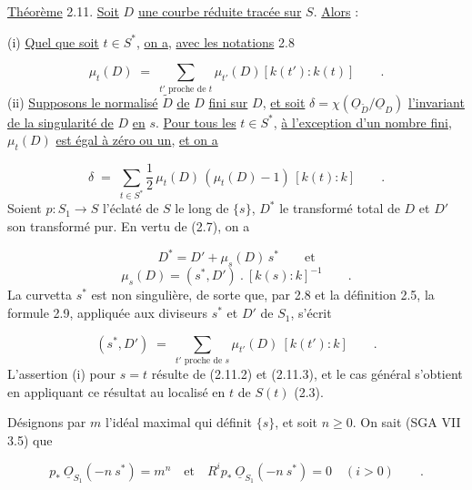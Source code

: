 \underline{Théorème} 2.11. \underline{Soit} $D$ \underline{une courbe réduite tracée sur} $S$. \underline{Alors} :

(i) \underline{Quel que soit} $t \in S^*$, \underline{on a}, \underline{avec les notations} 2.8

\begin{equation*}
\mu_t(D) \;=\; \sum_{t' \text{ proche de } t} \mu_{t'}(D)[k(t'):k(t)] \qquad .
\end{equation*}
(ii) \underline{Supposons le normalisé} $\widetilde{D}$ \underline{de} $D$ \underline{fini sur} $D$, \underline{et soit} $\delta = \chi(\underline{O}_{\widetilde{D}}/\underline{O}_D)$ \underline{l'invariant de la singularité de} $D$ \underline{en} $s$. \underline{Pour tous les} $t \in S^*$, \underline{à l'exception d'un nombre fini}, $\mu_t(D)$ \underline{est égal à zéro ou un}, \underline{et on a}

\begin{equation*}
\delta \;=\; \sum_{t \in S^*} \frac{1}{2}\,\mu_t(D)\,(\mu_t(D)-1)\,[k(t):k] \qquad .
\end{equation*}
Soient $p : S_1 \longrightarrow S$ l'éclaté de $S$ le long de $\{s\}$, $D^*$ le transformé total de $D$ et $D'$ son transformé pur. En vertu de (2.7), on a

\begin{equation}\tag{2.11.1}
D^* = D' + \mu_s(D)\, s^* \qquad \text{et}
\end{equation}
\begin{equation}\tag{2.11.2}
\mu_s(D) = (s^*,D')\ .\ [k(s):k]^{-1} \qquad .
\end{equation}
La curvetta $s^*$ est non singulière, de sorte que, par 2.8 et la définition 2.5, la formule 2.9, appliquée aux diviseurs $s^*$ et $D'$ de $S_1$, s'écrit

\begin{equation}\tag{2.11.3}
(s^*,D') \;=\; \sum_{t' \text{ proche de } s} \mu_{t'}(D)\ [k(t'):k] \qquad .
\end{equation}
L'assertion (i) pour $s = t$ résulte de (2.11.2) et (2.11.3), et le cas général s'obtient en appliquant ce résultat au localisé en $t$ de $S(t)$ (2.3).

Désignons par $m$ l'idéal maximal qui définit $\{s\}$, et soit $n \geq 0$. On sait (SGA VII 3.5) que

\begin{equation}\tag{2.11.4}
p_*\ \underline{O}_{S_1}(-n\ s^*) = m^n \quad \text{et} \quad R^i p_*\ \underline{O}_{S_1}(-n\ s^*) = 0 \quad (i > 0) \qquad .
\end{equation}

